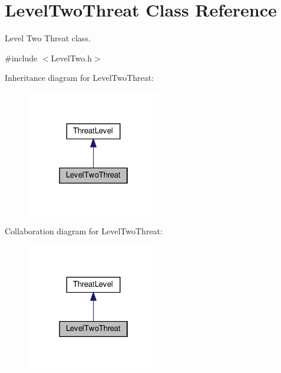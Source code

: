 \hypertarget{classLevelTwoThreat}{}\section{Level\+Two\+Threat Class Reference}
\label{classLevelTwoThreat}


Level Two Threat class.  




{\ttfamily \#include $<$Level\+Two.\+h$>$}



Inheritance diagram for Level\+Two\+Threat\+:\nopagebreak
\begin{figure}[H]
\begin{center}
\leavevmode
\includegraphics[width=166pt]{classLevelTwoThreat__inherit__graph}
\end{center}
\end{figure}


Collaboration diagram for Level\+Two\+Threat\+:\nopagebreak
\begin{figure}[H]
\begin{center}
\leavevmode
\includegraphics[width=166pt]{classLevelTwoThreat__coll__graph}
\end{center}
\end{figure}
